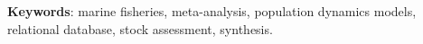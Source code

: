 


\noindent \textbf{Keywords}: marine fisheries, meta-analysis, population dynamics models, relational database, stock assessment, synthesis.


